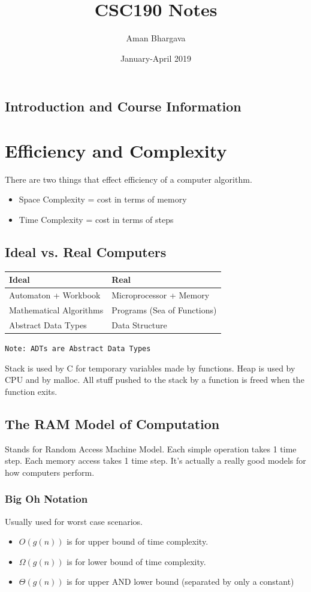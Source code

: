 \documentclass[a4paper,12pt]{report}
\begin{document}
\title{CSC190 Notes}
\author{Aman Bhargava}
\date{January-April 2019}
\maketitle

\tableofcontents

\section{Introduction and Course Information}

\chapter{Efficiency and Complexity}
There are two things that effect efficiency of a computer algorithm.
\begin{itemize}
\item Space Complexity = cost in terms of memory
\item Time Complexity = cost in terms of steps
\end{itemize}

\section{Ideal vs. Real Computers}
\begin{tabular}{l|l}
Ideal & Real \\
\hline
Automaton + Workbook & Microprocessor + Memory \\
Mathematical Algorithms & Programs (Sea of Functions) \\
Abstract Data Types & Data Structure 
\end{tabular}

\texttt{Note: ADTs are Abstract Data Types}

Stack is used by C for temporary variables made by functions. Heap is used by CPU and by malloc. All stuff pushed to the stack by a function is freed when the function exits. 

\section{The RAM Model of Computation}
Stands for Random Access Machine Model.
Each simple operation takes 1 time step. Each memory access takes 1 time step. It's actually a really good models for how computers perform.

\subsection{Big Oh Notation}
Usually used for worst case scenarios.
\begin{itemize}
\item $O(g(n))$ is for upper bound of time complexity.
\item $\Omega(g(n))$ is for lower bound of time complexity.
\item $\Theta(g(n))$ is for upper AND lower bound (separated by only a constant)
\end{itemize}
\end{document}
